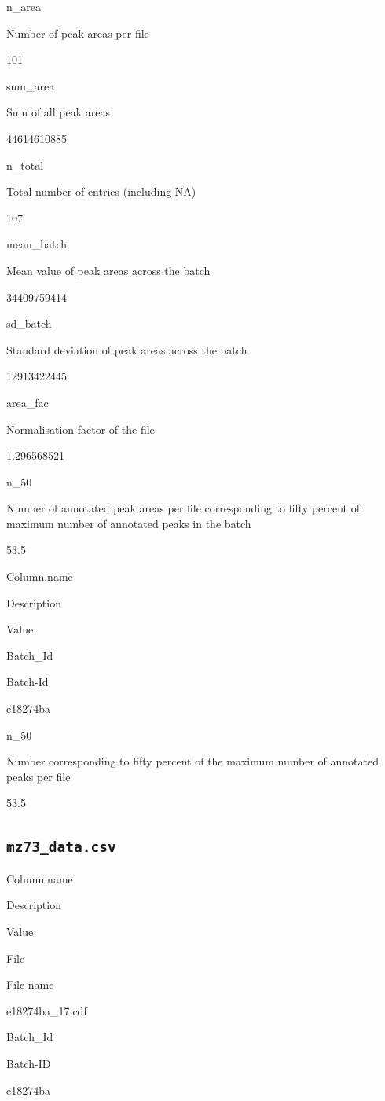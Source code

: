\documentclass[]{book}
\theoremstyle{definition}
\theoremstyle{definition}
\theoremstyle{definition}
\theoremstyle{remark}
\begin{document}
n\_area

Number of peak areas per file

101

sum\_area

Sum of all peak areas

44614610885

n\_total

Total number of entries (including NA)

107

mean\_batch

Mean value of peak areas across the batch

34409759414

sd\_batch

Standard deviation of peak areas across the batch

12913422445

area\_fac

Normalisation factor of the file

1.296568521

n\_50

Number of annotated peak areas per file corresponding to fifty percent
of maximum number of annotated peaks in the batch

53.5

Column.name

Description

Value

Batch\_Id

Batch-Id

e18274ba

n\_50

Number corresponding to fifty percent of the maximum number of annotated
peaks per file

53.5

\subsection{\texorpdfstring{\texttt{mz73\_data.csv}}{mz73\_data.csv}}\label{mz73_data.csv}

Column.name

Description

Value

File

File name

e18274ba\_17.cdf

Batch\_Id

Batch-ID

e18274ba
\end{document}
